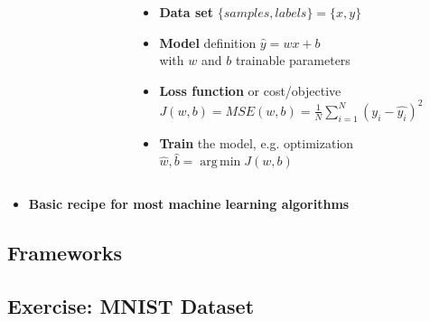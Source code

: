 \documentclass[aspectratio=169]{beamer}
\DeclareMathOperator*{\argmin}{arg\,min}
\begin{document}
\begin{frame}
\begin{columns}
\begin{column}{0.43\textwidth}
\begin{figure}
            \end{figure}
        \end{column}
        \begin{column}{0.53\textwidth}
            \begin{itemize}
                \item<1-> \textbf{Data set} $\{samples, labels\}=\{x, y\}$
                \item<2-> \textbf{Model} definition $\hat{y}=wx+b$\\ with $w$ and $b$ trainable parameters
                \item<3-> \textbf{Loss function} or cost/objective\\
                $J(w,b)=MSE(w,b)=\frac{1}{N}\sum_{i=1}^{N}(y_i-\hat{y_i})^2$
                \item<4-> \textbf{Train} the model, e.g. optimization\\
                $\hat{w}, \hat{b}=\argmin J(w, b)$ \\
                
            \end{itemize}
        \end{column}
    \end{columns}

    \bigskip
    \begin{itemize}
        \item<5>
            \begin{center}
                \textbf{Basic recipe for most machine learning algorithms}
            \end{center}
    \end{itemize}
\end{frame}

\subsection{Frameworks}
\label{subsec:frameworks}

\subsection{Exercise: MNIST Dataset}
\label{subsec:fnn-exercise}
\end{document}
